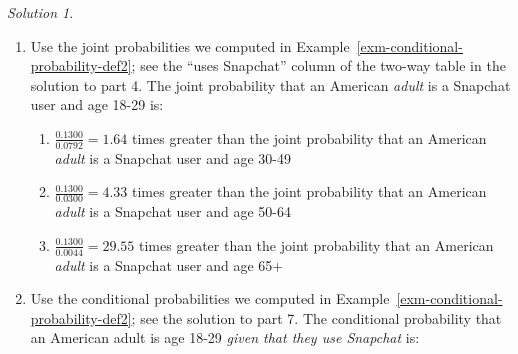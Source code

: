 \documentclass[
  letterpaper,
  DIV=11,
  numbers=noendperiod]{scrreprt}
\providecommand{\tightlist}{%
  \setlength{\itemsep}{0pt}\setlength{\parskip}{0pt}}
\theoremstyle{plain}
\theoremstyle{definition}
\theoremstyle{definition}
\theoremstyle{definition}
\theoremstyle{remark}
\newtheorem{refsolution}{Solution}[chapter]
\begin{document}
\begin{tcolorbox}[enhanced jigsaw, opacityback=0, rightrule=.15mm, coltitle=black, colframe=quarto-callout-tip-color-frame, toprule=.15mm, colbacktitle=quarto-callout-tip-color!10!white, opacitybacktitle=0.6, left=2mm, toptitle=1mm, breakable, title={Solution (click to expand)}, bottomtitle=1mm, colback=white, leftrule=.75mm, titlerule=0mm, arc=.35mm, bottomrule=.15mm]

\begin{refsolution}
\leavevmode

\begin{enumerate}
\def\labelenumi{\arabic{enumi}.}
\tightlist
\item
  Use the joint probabilities we computed in
  Example~\ref{exm-conditional-probability-def2}; see the ``uses
  Snapchat'' column of the two-way table in the solution to part 4. The
  joint probability that an American \emph{adult} is a Snapchat user and
  age 18-29 is:

  \begin{enumerate}
  \def\labelenumii{\alph{enumii}.}
  \tightlist
  \item
    \(\frac{0.1300}{0.0792} = 1.64\) times greater than the joint
    probability that an American \emph{adult} is a Snapchat user and age
    30-49
  \item
    \(\frac{0.1300}{0.0300} = 4.33\) times greater than the joint
    probability that an American \emph{adult} is a Snapchat user and age
    50-64
  \item
    \(\frac{0.1300}{0.0044} = 29.55\) times greater than the joint
    probability that an American \emph{adult} is a Snapchat user and age
    65+
  \end{enumerate}
\item
  Use the conditional probabilities we computed in
  Example~\ref{exm-conditional-probability-def2}; see the solution to
  part 7. The conditional probability that an American adult is age
  18-29 \emph{given that they use Snapchat} is:


\end{enumerate}
\end{refsolution}
\end{tcolorbox}
\end{document}
